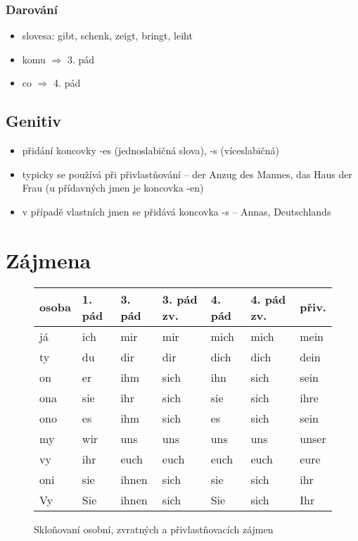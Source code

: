 \documentclass[a4paper,12pt]{report}
\begin{document}
\subsubsection{Darování}
\begin{itemize}
  \item slovesa: gibt, schenk, zeigt, bringt, leiht
  \item komu $\Rightarrow$ 3. pád
  \item co $\Rightarrow$ 4. pád
\end{itemize}

\subsection{Genitiv}

\begin{itemize}
  \item přidání koncovky -es (jednoslabičná slova), -s (víceslabičná)
  \item typicky se používá při přivlastňování -- der Anzug des Mannes, das Haus der Frau (u přídavných jmen je koncovka -en)
  \item v případě vlastních jmen se přidává koncovka -s -- Annas, Deutschlands
\end{itemize}

\newpage

\section{Zájmena}

\begin{figure}[h]
  \centering
  \begin{center}
    \begin{longtable}{ | m{1.8cm} | m{1.8cm}| m{1.8cm} | m{1.8cm}  | m{1.8cm} | m{1.8cm} | m{1.8cm} | }
      \hline
      osoba & 1. pád & 3. pád & 3. pád zv. & 4. pád & 4. pád zv. & přiv. \\
      \hline
      já    & ich    & mir    & mir        & mich   & mich       & mein  \\
      ty    & du     & dir    & dir        & dich   & dich       & dein  \\
      on    & er     & ihm    & sich       & ihn    & sich       & sein  \\
      ona   & sie    & ihr    & sich       & sie    & sich       & ihre  \\
      ono   & es     & ihm    & sich       & es     & sich       & sein  \\
      my    & wir    & uns    & uns        & uns    & uns        & unser \\
      vy    & ihr    & euch   & euch       & euch   & euch       & eure  \\
      oni   & sie    & ihnen  & sich       & sie    & sich       & ihr   \\
      Vy    & Sie    & ihnen  & sich       & Sie    & sich       & Ihr   \\
      \hline
    \end{longtable}
  \end{center}
  \caption*{Skloňovaní osobní, zvratných a přivlastňovacích zájmen}
\end{figure}
\end{document}
